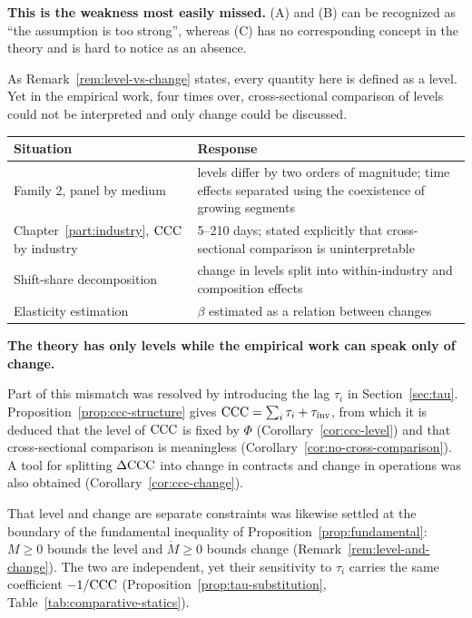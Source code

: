 \textbf{This is the weakness most easily missed.} (A) and (B) can be recognized as
``the assumption is too strong'', whereas (C) has no corresponding concept in the theory and
is hard to notice as an absence.

As Remark~\ref{rem:level-vs-change} states, every quantity here is defined as a level. Yet in
the empirical work, four times over, cross-sectional comparison of levels could not be
interpreted and only change could be discussed.

\begin{center}
\begin{tabularx}{\textwidth}{@{}lX@{}}
\toprule
Situation & Response \\
\midrule
Family 2, panel by medium & levels differ by two orders of magnitude; time effects separated using the coexistence of growing segments \\
Chapter~\ref{part:industry}, $\mathrm{CCC}$ by industry & 5--210 days; stated explicitly that cross-sectional comparison is uninterpretable \\
Shift-share decomposition & change in levels split into within-industry and composition effects \\
Elasticity estimation & $\beta$ estimated as a relation between changes \\
\bottomrule
\end{tabularx}
\label{tab:level-change-gap-response}
\end{center}

\textbf{The theory has only levels while the empirical work can speak only of change.}

Part of this mismatch was resolved by introducing the lag $\tau_i$ in
Section~\ref{sec:tau}. Proposition~\ref{prop:ccc-structure} gives
$\mathrm{CCC}=\sum_i\tau_i+\tau_{\mathrm{inv}}$, from which it is deduced that the level of $\mathrm{CCC}$ is
fixed by $\Phi$ (Corollary~\ref{cor:ccc-level}) and that cross-sectional comparison is
meaningless (Corollary~\ref{cor:no-cross-comparison}). A tool for splitting $\Delta\mathrm{CCC}$ into
change in contracts and change in operations was also obtained
(Corollary~\ref{cor:ccc-change}).

That level and change are separate constraints was likewise settled at the boundary of the
fundamental inequality of Proposition~\ref{prop:fundamental}: $M\geq 0$ bounds the level and
$\dot M\geq 0$ bounds change (Remark~\ref{rem:level-and-change}). The two are independent,
yet their sensitivity to $\tau_i$ carries the same coefficient $-1/\mathrm{CCC}$
(Proposition~\ref{prop:tau-substitution}, Table~\ref{tab:comparative-statics}).

